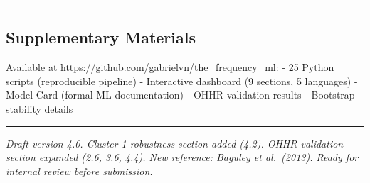 \documentclass[
]{article}
\begin{document}
\begin{center}\rule{0.5\linewidth}{0.5pt}\end{center}

\subsection{Supplementary Materials}\label{supplementary-materials}

Available at https://github.com/gabrielvn/the\_frequency\_ml: - 25 Python
scripts (reproducible pipeline) - Interactive dashboard (9 sections, 5
languages) - Model Card (formal ML documentation) - OHHR validation results -
Bootstrap stability details

\begin{center}\rule{0.5\linewidth}{0.5pt}\end{center}

\emph{Draft version 4.0. Cluster 1 robustness section added (4.2). OHHR
validation section expanded (2.6, 3.6, 4.4). New reference: Baguley et
al.~(2013). Ready for internal review before submission.}
\end{document}
